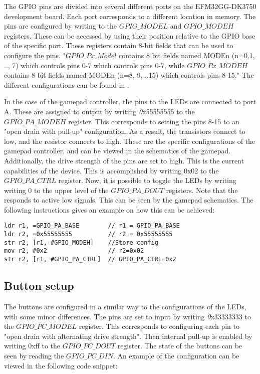 The GPIO pins are divided into several different ports on the EFM32GG-DK3750 development board. Each port corresponds to a different location in memory.  The pins are configured by writing to the $GPIO\_MODEL$ and $GPIO\_MODEH$ registers. These can be accessed by using their position relative to the GPIO base of the specific port. These registers contain 8-bit fields that can be used to configure the pins.  "$GPIO\_Px\_Model$ contains 8 bit fields named MODEn (n=0,1, .., 7) which controls pins 0-7 which controls pins 0-7, while $GPIO\_Px\_MODEH$ contains 8 bit fields named MODEn (n=8, 9, ..15) which controls pins 8-15." The different configurations can be found in \cite[p.758-759]{EFM32GG-rm}.    

In the case of the gamepad controller, the pins to the LEDs are connected to port A. These are assigned to output by writing {\emph 0x55555555} to  the $GPIO\_PA\_MODEH$ register. This corresponds to setting the pins 8-15 to an "open drain with pull-up" configuration\cite[p.758-759]{EFM32GG-rm}. As a result, the transistors connect to low, and the resistor connects to high. These are the specific configurations of the gamepad controller, and can be viewed in the schematics of the gamepad\cite{compendium}. Additionally, the drive strength of the pins are set to high. This is the current capabilities of the device. This is accomplished by writing 0x02 to the $GPIO\_PA\_CTRL$ register. Now, it is possible to toggle the LEDs by writing writing 0 to the upper level of the $GPIO\_PA\_DOUT$ registers. Note that the responds to active low signals. This can be seen by the gamepad schematics\cite{compendium}. The following instructions gives an example on how this can be achieved:


\begin{lstlisting}
ldr r1, =GPIO_PA_BASE        // r1 = GPIO_PA_BASE
ldr r2, =0x55555555          // r2 = 0x55555555  
str r2, [r1, #GPIO_MODEH]    //Store config
mov r2, #0x2                 // r2=0x02
str r2, [r1, #GPIO_PA_CTRL]  // GPIO_PA_CTRL=0x2                    

\end{lstlisting}


 

\subsection{Button setup}
The buttons are configured in a similar way to the configurations of the LEDs, with some minor differences. The pins are set to input by writing {\emph 0x33333333} to the $GPIO\_PC\_MODEL$ register. This corresponds to configuring each pin to "open drain with alternating drive strength"\cite[p.758-759]{EFM32GG-rm}. Then internal pull-up is enabled by writing 0xff to the $GPIO\_PC\_DOUT$ register. The state of the buttons can be seen by reading the $GPIO\_PC\_DIN$. An example of the configuration can be viewed in the following code snippet: 

